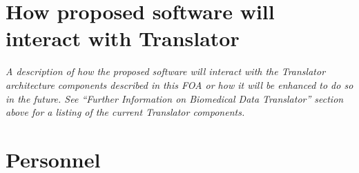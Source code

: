 \documentclass[11pt,notitlepage]{article}
\begin{document}

\section{How proposed software will interact with Translator}
\textit{A description of how the proposed software will interact with the Translator architecture
components described in this FOA or how it will be enhanced to do so in the future. See
“Further Information on Biomedical Data Translator” section above for a listing of the
current Translator components.}



\section{Personnel}



\end{document}
